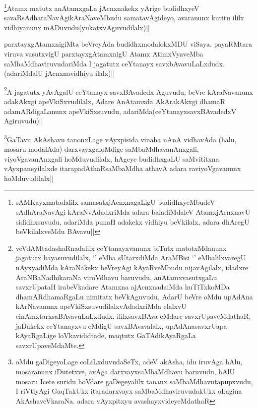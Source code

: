 
\begin{artha}
\footnote{sAMKayxmatadalilx samasatxjAcnxnagaLigU budidhxyeMbudeV sAdhAraNavAgi kAraNvAdadxriMda adara baladiMdaleV AtamxjAcnxnavU sididhxsuvudu, adariMda punaH adakekx vidhiyu beVkilalx, adara dhAregU beVkilalxveMdu BAvavu||}Atamx matutx anAtamxgaLa jAcnxnakekx yArige budidhxyeV savaRsAdharaNavAgikAraNaveMbudu samatavAgideyo, avaranunx kuritu ililx vidhiyanunx mADuvudu(yukatxvAguvudilalx)||
\end{artha}


\begin{artha}
parxtayxgAtamxnigiMta beVreyAda budidhxmodalokxMDU viSaya. payaRMtara viruva vasutxvigU parxtayxgAtamxnigU Atamx AtimxVyaveMba saMbaMdhaviruvudariMda I jagatutx ceYtanayx savxbAvavuLaLxdudx.(adariMdalU jAcnxnavidhiyu ilalx)||
\end{artha}


\begin{artha}
\footnote{veVdAMtadashaRnadalilx ceYtanayxvanunx biTutx matotxMdanunx jagatutx bayasuvudilalx, `\stext' eMba sUtarxdiMda AraMBisi `\stext' eMbalilxvaregU nAyxyadiMda kAraNakekx beVreyAgi kAyaRveMbudu nijavAgilalx, idadxre AraNBaNadhikaraNa viroVdhavu baruvudu, anAtamxvasutxgaLu savxrUpataH irabeVkadare Atamxna ajAcnxnadaiMda huTiTxkoMDa dhamARdhamaRgaLu nimitatx beVkAguvudu, AdarU beVre oMdu upAdAna kArNavanunx apeVkiSxsuvudilalxvAdadxriMda elalxvU cinAmxtarxsaBAvavuLaLxdudx, ililxsavxBAva eMdare savxrUpaveMdathaR, jaDakekx ceYtanayxvu eMdigU savxBAvavalalx, upAdAnasavxrUapa kAyaRgaLige loVkavididtade, maqtutx GaTAdikAyaRgaLa savxrUpaveMdaMte.}A jagatutx yAvAgalU ceYtanayx savxBAvadedx Aguvudu, beVre kAraNavanunx adakAkxgi apeVkiSxvudilalx, Adare AnAtamxda AkArakAkxgi dhamaR adamARdigaLanunx apeVkiSxsuvudu, adariMda(ceYtanayxsavxBAvadedxV Agiruvudu)||
\end{artha}


\begin{artha}
\footnote{oMdu gaDigeyoLage coLiLxduvudaSeTx, adeV akAsha, idu iruvAga hAlu, mosaranunx iDutetxve, avAga darxvayxsaMbaMdhavu baruvudu, hAlU mosaru Icete suridu hoVdare gaDegeyalilx tananx saMbaMdhavutapupxvudu, I riVtiyAgi GaqTakUkx itaradarxvayx saMbaMdhaviruvudakUkx oLagina AkAshaveVkaraNa. adara vAyxpitxyu avashayxvideyeMdathaR}GaTavu AkAshavu tanonxLage vAyxpisida vinaha nAnA vidhavAda (halu, mosaru modalAda) darxvayxgaloMdige saMbaMdhavanAnxgali, viyoVgavanAnxgali hoMduvudilalx, hAgeye budidhxgaLU saMvititxna vAyxpaneyilalxde itarapadAthaRsaMbaMdha athavA adara raviyoVgavanunx hoMduvudilalx||
\end{artha}

